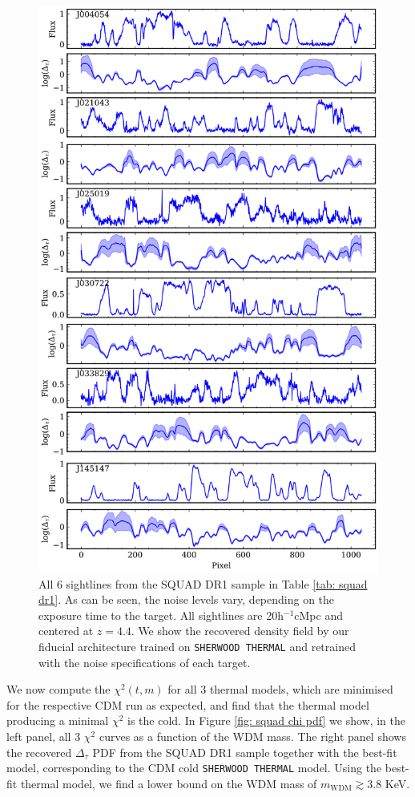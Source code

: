 \begin{figure}
    \centering
    \includegraphics[width=0.7\linewidth]{img/ML/SQUAD_pred.png}
    \caption{All 6 sightlines from the SQUAD DR1 sample in Table \ref{tab: squad dr1}. As can be seen, the noise levels vary, depending on the exposure time to the target. All sightlines are 20h$^{-1}$cMpc and centered at $z=4.4$. We show the recovered density field by our fiducial architecture trained on \texttt{SHERWOOD THERMAL} and retrained with the noise specifications of each target.}
    \label{fig: squad pred}
\end{figure}

We now compute the $\chi^2(t,m)$ for all 3 thermal models, which are minimised for the respective CDM run as expected, and find that the thermal model producing a minimal $\chi^2$ is the cold. In Figure \ref{fig: squad chi pdf} we show, in the left panel, all 3 $\chi^2$ curves as a function of the WDM mass. The right panel shows the recovered $\Delta_\tau$ PDF from the SQUAD DR1 sample together with the best-fit model, corresponding to the CDM cold \texttt{SHERWOOD THERMAL} model. Using the best-fit thermal model, we find a lower bound on the WDM mass of $m_{\mathrm{WDM}} \gtrsim 3.8$ KeV.


